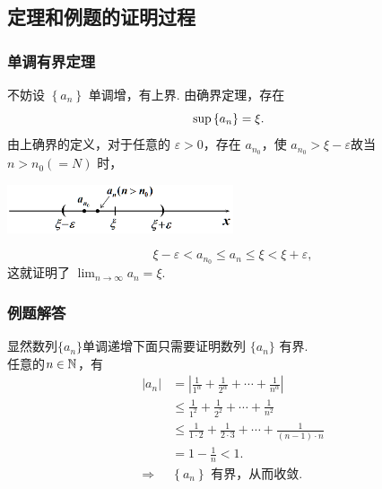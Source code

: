\documentclass[mathserif]{beamer}
\begin{document}
\subsection*{定理和例题的证明过程}
\begin{frame}[label=dandiaoyoujiezm]
\frametitle{单调有界定理\hfill\hyperlink{dandiaoyoujie<1>}{}}
\begin{proofs}
	\suojin 不妨设 $\left\{a_n\right\}$ 单调增，有上界. 由确界定理，存在 
	$$\sup \left\{a_n\right\}=\xi.\ \ $$  
	\suojin 由上确界的定义，对于任意的 $\varepsilon>0$，存在 $a_{n_0}$，使 $a_{n_0}>\xi-\varepsilon$\jh  故当 $n>n_0(=N)$ 时，
	\begin{center}
		\includegraphics[width=0.5\textwidth]{figures/ddyoujie1.png}
	\end{center}
	$$
	\xi-\varepsilon<a_{n_0} \leq a_n \leq \xi<\xi+\varepsilon,
	$$
	这就证明了 $\lim _{n \rightarrow \infty} a_n=\xi$.
\end{proofs}
\end{frame}





\begin{frame}[label=li_1jd]
  \frametitle{例题解答\hfill\hyperlink{li_1<1>}{}}
  \begin{proofs}
  \suojin 显然数列$\{a_n\}$单调递增\jh 下面只需要证明数列 $\{a_n\}$ 有界.\\
  \suojin  任意的$n\in \mathbb{N}$，有
  $$
  \begin{aligned}
  	|a_n|&=\left| \frac{1}{1^{\alpha}}+\frac{1}{2^{\alpha}}+\cdots+\frac{1}{n^{\alpha}} \right| \\
  	& \leqslant \frac{1}{1^{2}}+\frac{1}{2^{2}}+\cdots+\frac{1}{n^{2}} \\
  	& \leqslant \frac{1}{1\cdot 2}+\frac{1}{2\cdot 3}+\cdots+\frac{1}{(n-1)\cdot n} \\
  	& =1-\frac{1}{n}<1. \\
  	\Rightarrow&\left\{a_n\right\} \text { 有界，从而收敛. }
  \end{aligned}
  $$ 
  \end{proofs} 
\end{frame}
\end{document}
